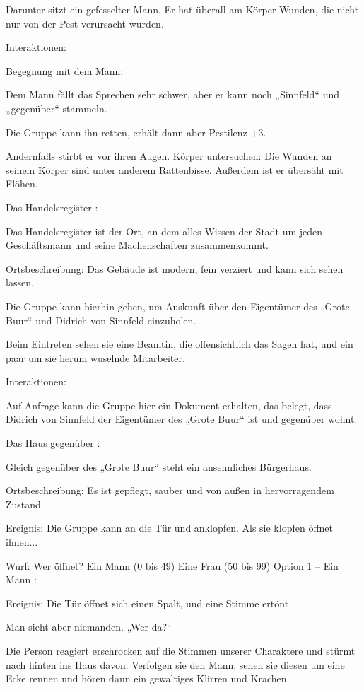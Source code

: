 Darunter sitzt ein gefesselter Mann. Er hat überall am Körper Wunden, die nicht nur von der Pest verursacht wurden.



Interaktionen:

Begegnung mit dem Mann:

Dem Mann fällt das Sprechen sehr schwer, aber er kann noch „Sinnfeld“ und „gegenüber“ stammeln.

Die Gruppe kann ihn retten, erhält dann aber Pestilenz +3.

Andernfalls stirbt er vor ihren Augen.
Körper untersuchen: Die Wunden an seinem Körper sind unter anderem Rattenbisse. Außerdem ist er übersäht mit Flöhen.

Das Handelsregister
:

Das Handelsregister ist der Ort, an dem alles Wissen der Stadt um jeden Geschäftsmann und seine Machenschaften zusammenkommt.

Ortsbeschreibung: Das Gebäude ist modern, fein verziert und kann sich sehen lassen.

Die Gruppe kann hierhin gehen, um Auskunft über den Eigentümer des „Grote Buur“ und Didrich von Sinnfeld einzuholen.

Beim Eintreten sehen sie eine Beamtin, die offensichtlich das Sagen hat, und ein paar um sie herum wuselnde Mitarbeiter.

Interaktionen:

Auf Anfrage kann die Gruppe hier ein Dokument erhalten, das belegt, dass Didrich von Sinnfeld der Eigentümer des „Grote Buur“ ist und gegenüber wohnt.

Das Haus gegenüber
:

Gleich gegenüber des „Grote Buur“ steht ein ansehnliches Bürgerhaus.

Ortsbeschreibung: Es ist gepflegt, sauber und von außen in hervorragendem Zustand.

Ereignis: Die Gruppe kann an die Tür und anklopfen. Als sie klopfen öffnet ihnen...

Wurf: Wer öffnet?
Ein Mann (0 bis 49)
Eine Frau (50 bis 99)
Option 1 – Ein Mann
:

Ereignis: Die Tür öffnet sich einen Spalt, und eine Stimme ertönt.

Man sieht aber niemanden. „Wer da?“

Die Person reagiert erschrocken auf die Stimmen unserer Charaktere und stürmt nach hinten ins Haus davon. Verfolgen sie den Mann, sehen sie diesen um eine Ecke rennen und hören dann ein gewaltiges Klirren und Krachen.

